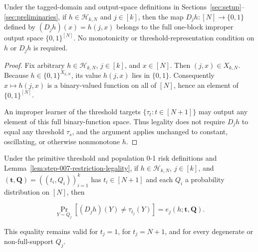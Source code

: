 \begin{lemma}\label{lem:step-007-restriction-legality}
Under the tagged-domain and output-space definitions in
Sections~\ref{sec:setup}--\ref{sec:preliminaries}, if
\(h\in\mathcal H_{k,N}\) and \(j\in[k]\), then the map
\(D_jh:[N]\to\{0,1\}\) defined by \((D_jh)(x)=h(j,x)\) belongs to the full
one-block improper output space \(\{0,1\}^{[N]}\). No monotonicity or
threshold-representation condition on \(h\) or \(D_jh\) is required.
\end{lemma}

\begin{proof}
Fix arbitrary \(h\in\mathcal H_{k,N}\), \(j\in[k]\), and \(x\in[N]\).
Then \((j,x)\in X_{k,N}\). Because
\(h\in\{0,1\}^{X_{k,N}}\), its value \(h(j,x)\) lies in \(\{0,1\}\).
Consequently \(x\mapsto h(j,x)\) is a binary-valued function on all of
\([N]\), hence an element of \(\{0,1\}^{[N]}\).

An improper learner of the threshold targets \(\{\tau_t:t\in[N+1]\}\)
may output any element of this full binary-function space. Thus legality
does not require \(D_jh\) to equal any threshold \(\tau_s\), and the argument
applies unchanged to constant, oscillating, or otherwise nonmonotone \(h\).
\end{proof}

\begin{proposition}\label{prop:step-007-risk-identity}
Under the primitive threshold and population 0-1 risk definitions and
Lemma~\ref{lem:step-007-restriction-legality}, if
\(h\in\mathcal H_{k,N}\), \(j\in[k]\), and
\((\boldsymbol t,\boldsymbol Q)=((t_i,Q_i))_{i=1}^k\) has
\(t_i\in[N+1]\) and each \(Q_i\) a probability distribution on \([N]\),
then

\[
  \Pr_{Y\sim Q_j}\!\left[(D_jh)(Y)\ne\tau_{t_j}(Y)\right]
  =e_j(h;\boldsymbol t,\boldsymbol Q).
\]

This equality remains valid for \(t_j=1\), for \(t_j=N+1\), and for every
degenerate or non-full-support \(Q_j\).
\end{proposition}


